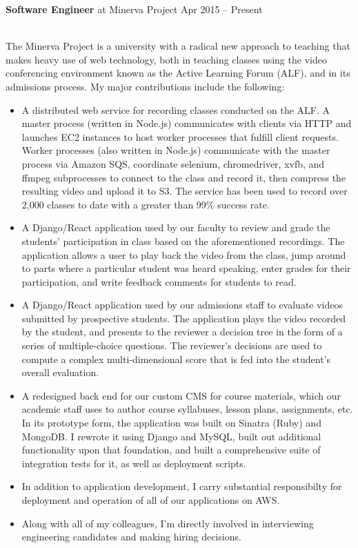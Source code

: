 \documentclass[10pt]{article}
\begin{document}
\headedsection
  {\textbf{Software Engineer} at Minerva Project}
  {Apr 2015 -- Present}
  {\\The Minerva Project is a university with a radical new approach to teaching that makes
    heavy use of web technology, both in teaching classes using the video conferencing
    environment known as the Active Learning Forum (ALF), and in its admissions process. My
    major contributions include the following:
   \begin{itemize}
   \item A distributed web service for recording classes conducted on the ALF. A master process
     (written in Node.js) communicates with clients via HTTP and launches EC2 instances to host
     worker processes that fulfill client requests.  Worker processes (also written in Node.js)
     communicate with the master process via Amazon SQS, coordinate selenium, chromedriver,
     xvfb, and ffmpeg subprocesses to connect to the class and record it, then compress the
     resulting video and upload it to S3. The service has been used to record over 2,000 classes
     to date with a greater than 99\% success rate.
   \item A Django/React application used by our faculty to review and grade the students'
     participation in class based on the aforementioned recordings. The application allows a
     user to play back the video from the class, jump around to parts where a particular student
     was heard speaking, enter grades for their participation, and write feedback comments for
     students to read.
   \item A Django/React application used by our admissions staff to evaluate videos submitted by
     prospective students. The application plays the video recorded by the student, and presents
     to the reviewer a decision tree in the form of a series of multiple-choice questions. The
     reviewer's decisions are used to compute a complex multi-dimensional score that is fed into
     the student's overall evaluation.
   \item A redesigned back end for our custom CMS for course materials, which our academic staff
     uses to author course syllabuses, lesson plans, assignments, etc.  In its prototype form,
     the application was built on Sinatra (Ruby) and MongoDB.  I rewrote it using Django and
     MySQL, built out additional functionality upon that foundation, and built a comprehensive
     suite of integration tests for it, as well as deployment scripts.
   \item In addition to application development, I carry substantial responsibilty for
     deployment and operation of all of our applications on AWS.
   \item Along with all of my colleagues, I'm directly involved in interviewing engineering
     candidates and making hiring decisions.
   \end{itemize}}
\end{document}
